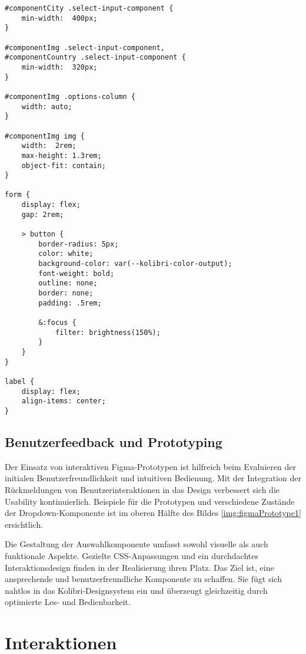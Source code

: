 \begin{lstlisting}[style = htmlcssjs, caption = Flexible Layouts für Demo-Page, label = code:layoutDemoPage]
#componentCity .select-input-component {
    min-width:  400px;
}

#componentImg .select-input-component,
#componentCountry .select-input-component {
    min-width:  320px;
}

#componentImg .options-column {
    width: auto;
}

#componentImg img {
    width:  2rem;
    max-height: 1.3rem;
    object-fit: contain;
}

form {
    display: flex;
    gap: 2rem;

    > button {
        border-radius: 5px;
        color: white;
        background-color: var(--kolibri-color-output);
        font-weight: bold;
        outline: none;
        border: none;
        padding: .5rem;

        &:focus {
            filter: brightness(150%);
        }
    }
}

label {
    display: flex;
    align-items: center;
}
\end{lstlisting}


\subsection{Benutzerfeedback und Prototyping}
\label{sec:userFeedbackPtototyping}

Der Einsatz von interaktiven Figma-Prototypen ist hilfreich beim Evaluieren der initialen Benutzerfreundlichkeit und intuitiven Bedienung. 
Mit der Integration der Rückmeldungen von Benutzerinteraktionen in das Design verbessert sich die Usability kontinuierlich.
Beispiele für die Prototypen und verschiedene Zustände der Dropdown-Komponente ist im oberen Hälfte des Bildes \ref{img:figmaPrototype1} ersichtlich.

Die Gestaltung der Auswahlkomponente umfasst sowohl visuelle als auch funktionale Aspekte. 
Gezielte CSS-Anpassungen und ein durchdachtes Interaktionsdesign finden in der Realisierung ihren Platz. 
Das Ziel ist, eine ansprechende und benutzerfreundliche Komponente zu schaffen. 
Sie fügt sich nahtlos in das Kolibri-Designsystem ein und überzeugt gleichzeitig durch optimierte Les- und Bedienbarkeit.


\section{Interaktionen}
\label{sec:interaction}

